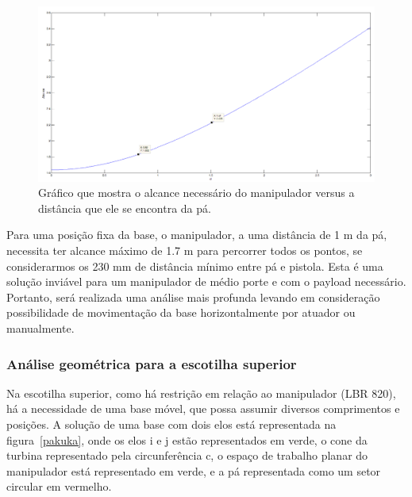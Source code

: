 \begin{figure}[h!]
\centering
	\includegraphics[width=\columnwidth]{figs/estudo/geometrico/reach.png} 
	\caption{Gráfico que mostra o alcance necessário do manipulador versus a
	distância que ele se encontra da pá.}
	\label{reach} 
\end{figure}

Para uma posição fixa da base, o manipulador, a uma distância de 1 m
da pá, necessita ter alcance máximo de 1.7 m para percorrer todos os pontos, se
considerarmos os 230 mm de distância mínimo entre pá e pistola. Esta é uma
solução inviável para um manipulador de médio porte e com o payload necessário.
Portanto, será realizada uma análise mais profunda levando em consideração
possibilidade de movimentação da base horizontalmente por atuador ou
manualmente.

\subsubsection{Análise geométrica para a escotilha superior}
Na escotilha superior, como há restrição em relação ao manipulador (LBR 820), há
a necessidade de uma base móvel, que possa assumir diversos comprimentos e
posições. A solução de uma base com dois elos está representada na
figura~\ref{pakuka}, onde os elos i e j estão representados em verde, o cone
da turbina representado pela circunferência c, o espaço de trabalho planar do
manipulador está representado em verde, e a pá representada como um setor
circular em vermelho.

